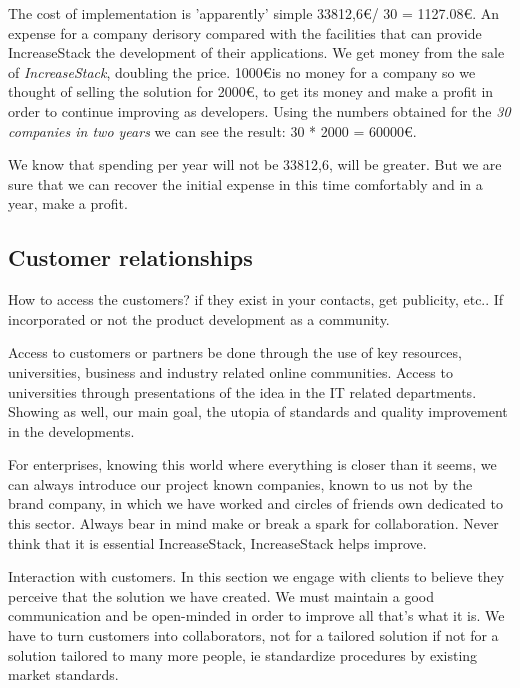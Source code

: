 \documentclass[11pt]{scrartcl}
\begin{document}
\par The cost of implementation is 'apparently' simple 33812,6\euro / 30 = 1127.08\euro. An expense for a company derisory compared with the facilities that can provide IncreaseStack the development of their applications. We get money from the sale of \emph{IncreaseStack}, doubling the price. 1000\euro is no money for a company so we thought of selling the solution for 2000\euro, to get its money and make a profit in order to continue improving as developers. Using the numbers obtained for the \emph{30 companies in two years} we can see the result: 30 * 2000 = 60000\euro.

\par We know that spending per year will not be 33812,6, will be greater. But we are sure that we can recover the initial expense in this time comfortably and in a year, make a profit.

\subsection{Customer relationships}

\par How to access the customers? if they exist in your contacts, get publicity, etc.. If incorporated or not the product development as a community.

\par Access to customers or partners be done through the use of key resources, universities, business and industry related online communities.
Access to universities through presentations of the idea in the IT related departments. Showing as well, our main goal, the utopia of standards and quality improvement in the developments.

\par For enterprises, knowing this world where everything is closer than it seems, we can always introduce our project known companies, known to us not by the brand company, in which we have worked and circles of friends own dedicated to this sector. Always bear in mind make or break a spark for collaboration. Never think that it is essential IncreaseStack, IncreaseStack helps improve.

\par Interaction with customers. In this section we engage with clients to believe they perceive that the solution we have created. We must maintain a good communication and be open-minded in order to improve all that's what it is. We have to turn customers into collaborators, not for a tailored solution if not for a solution tailored to many more people, ie standardize procedures by existing market standards.
\end{document}
